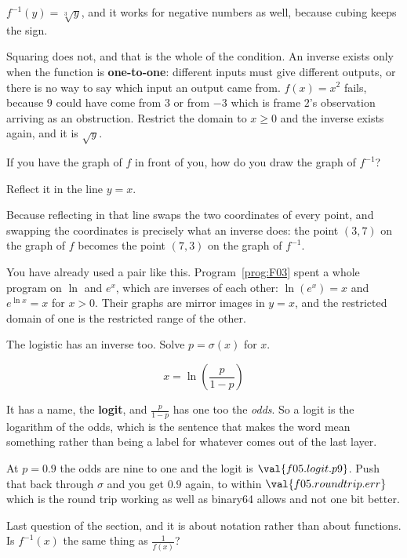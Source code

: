 \begin{fr}
$f^{-1}(y) = \sqrt[3]{y}$, and it works for negative numbers as well, because
cubing keeps the sign.

Squaring does not, and that is the whole of the condition. An inverse exists
only when the function is \textbf{one-to-one}: different inputs must give
different outputs, or there is no way to say which input an output came from.
$f(x) = x^{2}$ fails, because $9$ could have come from $3$ or from $-3$ \dash{}
which is frame $2$'s observation arriving as an obstruction. Restrict the
domain to $x \ge 0$ and the inverse exists again, and it is $\sqrt{y}$.

If you have the graph of $f$ in front of you, how do you draw the graph of
$f^{-1}$?
\nextframe
\end{fr}

\begin{fr}
\begin{ansblock}
Reflect it in the line $y = x$.
\end{ansblock}

Because reflecting in that line swaps the two coordinates of every point, and
swapping the coordinates is precisely what an inverse does: the point
$(3, 7)$ on the graph of $f$ becomes the point $(7, 3)$ on the graph of
$f^{-1}$.

You have already used a pair like this. Program~\ref{prog:F03} spent a whole
program on $\ln$ and $e^{x}$, which are inverses of each other:
$\ln(e^{x}) = x$ and $e^{\ln x} = x$ for $x > 0$. Their graphs are mirror
images in $y = x$, and the restricted domain of one is the restricted range of
the other.

The logistic has an inverse too. Solve $p = \sigma(x)$ for $x$.
\nextframe
\end{fr}

\begin{fr}
\begin{ansblock}
\[ x = \ln\!\left(\frac{p}{1 - p}\right) \]
\end{ansblock}

It has a name, the \textbf{logit}, and $\frac{p}{1-p}$ has one too \dash{} the
\emph{odds}. So a logit is the logarithm of the odds, which is the sentence
that makes the word mean something rather than being a label for whatever comes
out of the last layer.

At $p = \num{0.9}$ the odds are nine to one and the logit is
$\val{f05.logit.p9}$. Push that back through $\sigma$ and you get
$\num{0.9}$ again, to within $\val{f05.roundtrip.err}$ \dash{} which is the
round trip working as well as binary64 allows and not one bit better.

Last question of the section, and it is about notation rather than about
functions. Is $f^{-1}(x)$ the same thing as $\frac{1}{f(x)}$?
\nextframe
\end{fr}

